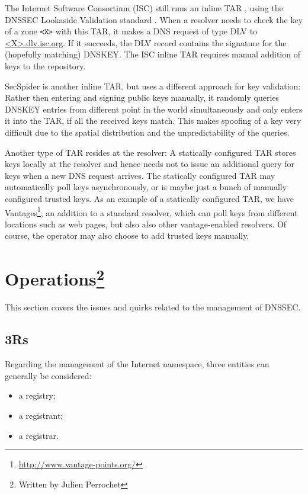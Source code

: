 \documentclass[a4paper,twocolumn]{scrartcl}
\newcommand{\wbjp}{\protect\footnote{Written by Julien Perrochet}}
\begin{document}
The Internet Software Consortium (ISC) still runs an inline TAR
\cite{iscDlv}, using the DNSSEC Lookaside Validation standard
\cite{RFC5074}. When a resolver needs to check the key of a zone
\verb|<X>| with this TAR, it makes a DNS request of type DLV to 
\url{<X>.dlv.isc.org}. If it succeeds, the DLV record contains the
signature for the (hopefully matching) DNSKEY. The ISC inline TAR
requires manual addition of keys to the repository.

SecSpider \cite{secspider, Osterweil09} is another inline TAR, but
uses a different approach for key validation: Rather then entering and
signing public keys manually, it randomly queries DNSKEY entries from
different point in the world simultaneously and only enters it into
the TAR, if all the received keys match. This makes spoofing of a key
very difficult due to the spatial distribution and the
unpredictability of the queries.

Another type of TAR resides at the resolver: A statically configured
TAR stores keys locally at the resolver and hence needs not to issue an
additional query for keys when a new DNS request arrives. The
statically configured TAR may automatically poll keys asynchronously,
or is maybe just a bunch of manually configured trusted keys. As an
example of a statically configured TAR, we have
Vantages\footnote{\url{http://www.vantage-points.org/}}, an addition
to a standard resolver, \cite{Osterweil09} which can poll keys from
different locations such as web pages, but also also other
vantage-enabled resolvers. Of course, the operator may also choose to
add trusted keys manually.

\section{Operations\wbjp}
This section covers the issues and quirks related to the management of DNSSEC.
\subsection{3Rs}
Regarding the management of the Internet namespace, three entities can generally be considered:

\begin{itemize}
\item a registry;
\item a registrant;
\item a registrar.
\end{itemize}
\end{document}
